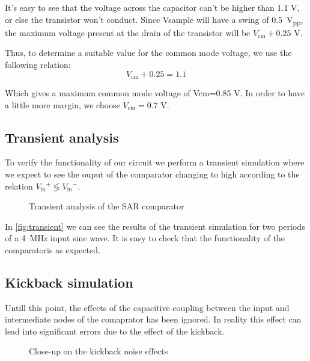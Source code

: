 \documentclass{article}
\newcommand*{\subb}[1]{\ensuremath{_{\mathrm{#1}}}}
\begin{document}
 It’s easy to see that the voltage across the capacitor can’t be higher than 1.1 V, or else the transistor won’t conduct. Since Vsample will have a swing of \SI{0.5}{\volt_{pp}}, the maximum voltage present at the drain of the transistor will be $V\subb{cm} + 0.25$ V.

 Thus, to determine a suitable value for the common mode voltage, we use the following relation:
 \begin{equation}
  V\subb{cm} + 0.25=1.1
 \end{equation}

 Which gives a maximum common mode voltage of Vcm=0.85 V. In order to have a little more margin, we choose $V\subb{cm}=0.7$ V.


 \subsection{Transient analysis}
 To verify the functionality of our circuit we perform a transient simulation where we expect to see the ouput of the comparator changing to high according to the relation $V\subb{in}^+\lessgtr V\subb{in}^-$.

 \begin{figure}[!h]
  \centering
  \caption{Transient analysis of the SAR comparator}
  \label{fig:transient}
  
 \end{figure}

 In \autoref{fig:transient} we can see the results of the transient simulation for two periods of a \SI{4}{\MHz} input sine wave. It is easy to check that the functionality of the comparatoris as expected.
 \subsection{Kickback simulation}
 Untill this point, the effects of the capacitive coupling between the input and intermediate nodes of the comaprator has been ignored. In reality this effect can lead into significant errors due to the effect of the kickback.

 \begin{figure}[!h]
  \centering
  \caption{Close-up on the kickback noise effects}
  \label{fig:kickback_closeup}
  
 \end{figure}
\end{document}
